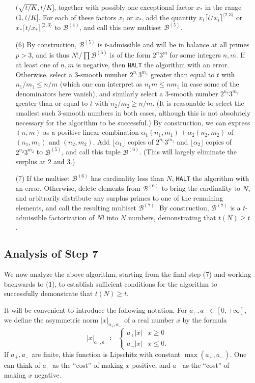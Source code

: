 \documentclass[12pt,a4paper,reqno]{amsart}
\numberwithin{equation}{section}
\theoremstyle{plain}
\theoremstyle{definition}
\newcommand\tuple{{\mathcal B}}
\begin{document}
\begin{enumerate}
$(\sqrt{t/K}, t/K]$, together with possibly one exceptional factor $x_*$ in the range $(1, t/K]$.  For each of these factors $x_i$ or $x_*$, add the quantity $x_i \lceil t/x_i \rceil^{\langle 2,3 \rangle}$ or $x_* \lceil t/x_* \rceil^{\langle 2,3 \rangle}$ to $\tuple^{(4)}$, and call this new multiset $\tuple^{(5)}$.  
\item[(6)] By construction, $\tuple^{(5)}$ is $t$-admissible and will be in balance at all primes $p>3$, and is thus $N!/\prod \tuple^{(5)}$ is of the form $2^n 3^m$ for some integers $n,m$.  If at least one of $n,m$ is negative, then \texttt{HALT} the algorithm with an error.  Otherwise, select a $3$-smooth number $2^{n_1} 3^{m_1}$ greater than equal to $t$ with $n_1/m_1 \leq n/m$ (which one can interpret as $n_1 m \leq nm_1$ in case some of the denominators here vanish), and similarly select a $3$-smooth number $2^{n_2} 3^{m_2}$ greater than or equal to $t$ with $n_2/m_2 \geq n/m$.  (It is reasonable to select the smallest such $3$-smooth numbers in both cases, although this is not absolutely necessary for the algorithm to be successful.) By construction, we can express $(n,m)$ as a positive linear combination $\alpha_1 (n_1,m_1) + \alpha_2 (n_2,m_2)$ of $(n_1,m_1)$ and $(n_2,m_2)$.  Add $\lfloor \alpha_1 \rfloor$ copies of $2^{n_1} 3^{m_1}$ and $\lfloor \alpha_2 \rfloor$ copies of $2^{n_2} 3^{m_2}$ to $\tuple^{(5)}$, and call this tuple $\tuple^{(6)}$.  (This will largely eliminate the surplus at $2$ and $3$.)
\item[(7)] If the multiset $\tuple^{(6)}$ has cardinality less than $N$, \texttt{HALT} the algorithm with an error.  Otherwise, delete elements from $\tuple^{(6)}$ to bring the cardinality to $N$, and arbitrarily distribute any surplus primes to one of the remaining elements, and call the resulting multiset $\tuple^{(7)}$.  By construction, $\tuple^{(7)}$ is a $t$-admissible factorization of $N!$ into $N$ numbers, demonstrating that $t(N) \geq t$.
\end{enumerate}

\subsection{Analysis of Step 7}

We now analyze the above algorithm, starting from the final step (7) and working backwards to (1), to establish sufficient conditions for the algorithm to successfully demonstrate that $t(N) \geq t$.

It will be convenient to introduce the following notation.
For $a_+,a_- \in [0,+\infty]$, we define the asymmetric norm $|x|_{a_+,a_-}$ of a real number $x$ by the formula
$$ 
|x|_{a_+,a_-} \coloneqq  \begin{cases} 
  a_+ |x| & x\geq 0 \\
  a_- |x| & x\leq 0.
\end{cases}
$$
If $a_+,a_-$ are finite, this function is Lipschitz with constant $\max(a_+,a_-)$.  One can think of $a_+$ as the ``cost'' of making $x$ positive, and $a_-$ as the
``cost'' of making $x$ negative.
\end{document}
